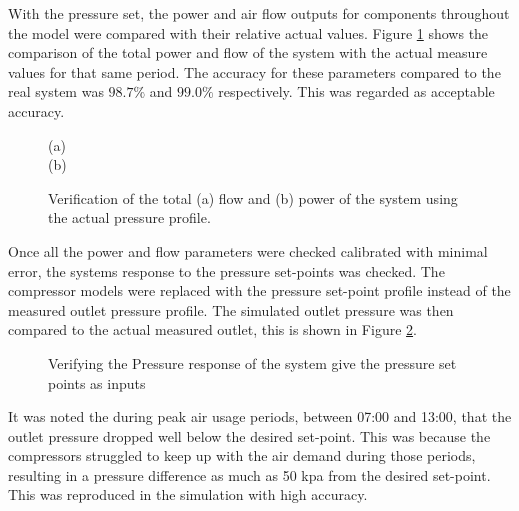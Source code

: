  	With the pressure set, the power and air flow outputs for components throughout the model were compared with their relative actual values. Figure \ref{fig: Verification Power kusasalethu} shows the comparison of the total power and flow of the system with the actual measure values for that same period. The accuracy for these parameters compared to the real system was $98.7 \%$ and $99.0 \%$ respectively. This was regarded as acceptable accuracy. 
 
	\begin{figure}[h]
		\centering
		\fbox{}
		(a)\\
		\fbox{}
		(b)\\
		\caption{Verification of the total (a) flow and (b) power of the system using the actual pressure profile.}
		\label{fig: Verification Power kusasalethu}
	\end{figure}

	Once all the power and flow parameters were checked calibrated with minimal error, the systems response to the pressure set-points was checked. The compressor models were replaced with the pressure set-point profile instead of the measured outlet pressure profile. The simulated outlet pressure was then compared to the actual measured outlet, this is shown in Figure \ref{fig: Verification Pressure kusasalethu Setpoint}.

	\begin{figure}[h]
		\centering
		\fbox{}
		\caption{Verifying the Pressure response of the system give the pressure set points as inputs}
		\label{fig: Verification Pressure kusasalethu Setpoint}
	\end{figure}
	\par 
	It was noted the during peak air usage periods, between 07:00 and 13:00, that the outlet pressure dropped well below the desired set-point. This was because the compressors struggled to keep up with the air demand during those periods, resulting in a pressure difference as much as 50 kpa from the desired set-point. This was reproduced in the simulation with high accuracy.
